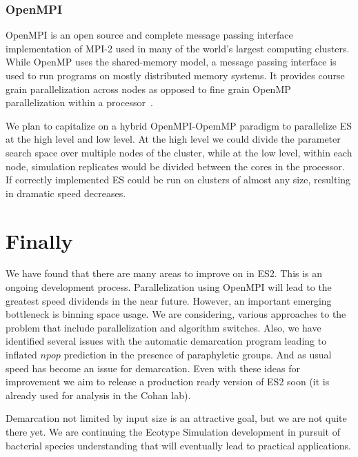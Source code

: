 \subsubsection*{OpenMPI}
OpenMPI is an open source and complete message passing interface implementation of MPI-2 used in many of the world's largest computing clusters.
While OpenMP uses the shared-memory model, a message passing interface is used to run programs on mostly distributed memory systems.
It provides course grain parallelization across nodes as opposed to fine grain OpenMP parallelization within a processor~\cite{gabriel04:_open_mpi}.

We plan to capitalize on a hybrid OpenMPI-OpemMP paradigm to parallelize ES at the high level and low level.
At the high level we could divide the parameter search space over multiple nodes of the cluster, while at the low level, within each node, simulation replicates would be divided between the cores in the processor.
If correctly implemented ES could be run on clusters of almost any size, resulting in dramatic speed decreases.



\section{Finally}
We have found that there are many areas to improve on in ES2.
This is an ongoing development process.
Parallelization using OpenMPI will lead to the greatest speed dividends in the near future.
However, an important emerging bottleneck is binning space usage.
We are considering, various approaches to the problem that include parallelization and algorithm switches.
Also, we have identified several issues with the automatic demarcation program leading to inflated $npop$ prediction in the presence of paraphyletic groups.
And as usual speed has become an issue for demarcation.
Even with these ideas for improvement we aim to release a production ready version of ES2 soon (it is already used for analysis in the Cohan lab).

Demarcation not limited by input size is an attractive goal, but we are not quite there yet.
We are continuing the Ecotype Simulation development in pursuit of bacterial species understanding that will eventually lead to practical applications.